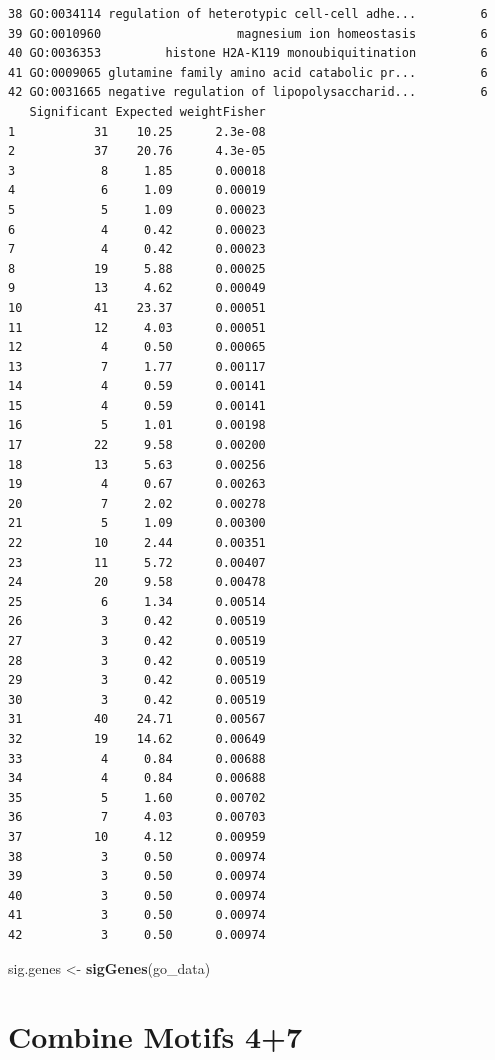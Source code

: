 \documentclass[]{article}
\newenvironment{Shaded}{\begin{snugshade}}{\end{snugshade}}
\newcommand{\KeywordTok}[1]{\textcolor[rgb]{0.13,0.29,0.53}{\textbf{#1}}}
\newcommand{\StringTok}[1]{\textcolor[rgb]{0.31,0.60,0.02}{#1}}
\newcommand{\NormalTok}[1]{#1}
\begin{document}
\begin{verbatim}
38 GO:0034114 regulation of heterotypic cell-cell adhe...         6
39 GO:0010960                   magnesium ion homeostasis         6
40 GO:0036353         histone H2A-K119 monoubiquitination         6
41 GO:0009065 glutamine family amino acid catabolic pr...         6
42 GO:0031665 negative regulation of lipopolysaccharid...         6
   Significant Expected weightFisher
1           31    10.25      2.3e-08
2           37    20.76      4.3e-05
3            8     1.85      0.00018
4            6     1.09      0.00019
5            5     1.09      0.00023
6            4     0.42      0.00023
7            4     0.42      0.00023
8           19     5.88      0.00025
9           13     4.62      0.00049
10          41    23.37      0.00051
11          12     4.03      0.00051
12           4     0.50      0.00065
13           7     1.77      0.00117
14           4     0.59      0.00141
15           4     0.59      0.00141
16           5     1.01      0.00198
17          22     9.58      0.00200
18          13     5.63      0.00256
19           4     0.67      0.00263
20           7     2.02      0.00278
21           5     1.09      0.00300
22          10     2.44      0.00351
23          11     5.72      0.00407
24          20     9.58      0.00478
25           6     1.34      0.00514
26           3     0.42      0.00519
27           3     0.42      0.00519
28           3     0.42      0.00519
29           3     0.42      0.00519
30           3     0.42      0.00519
31          40    24.71      0.00567
32          19    14.62      0.00649
33           4     0.84      0.00688
34           4     0.84      0.00688
35           5     1.60      0.00702
36           7     4.03      0.00703
37          10     4.12      0.00959
38           3     0.50      0.00974
39           3     0.50      0.00974
40           3     0.50      0.00974
41           3     0.50      0.00974
42           3     0.50      0.00974
\end{verbatim}

\begin{Shaded}
\begin{Highlighting}[]
\NormalTok{sig.genes <-}\StringTok{ }\KeywordTok{sigGenes}\NormalTok{(go_data)}
\end{Highlighting}
\end{Shaded}

\section{Combine Motifs 4+7}\label{combine-motifs-47}
\end{document}
